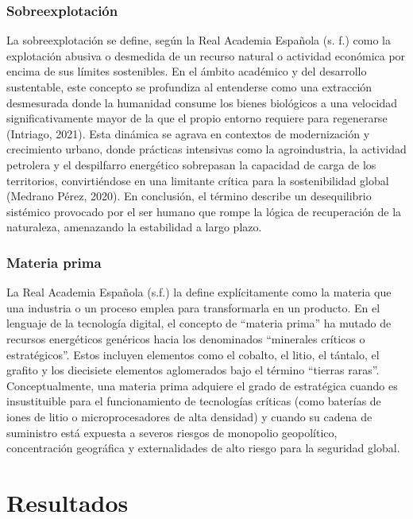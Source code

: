\documentclass[stu,12pt,a4paper]{apa7}
\begin{document}
    \subsubsection{Sobreexplotación}
La sobreexplotación se define, según la Real Academia Española (s. f.) como la explotación abusiva o desmedida de un recurso natural o actividad económica por encima de sus límites sostenibles. En el ámbito académico y del desarrollo sustentable, este concepto se profundiza al entenderse como una extracción desmesurada donde la humanidad consume los bienes biológicos a una velocidad significativamente mayor de la que el propio entorno requiere para regenerarse (Intriago, 2021). Esta dinámica se agrava en contextos de modernización y crecimiento urbano, donde prácticas intensivas como la agroindustria, la actividad petrolera y el despilfarro energético sobrepasan la capacidad de carga de los territorios, convirtiéndose en una limitante crítica para la sostenibilidad global (Medrano Pérez, 2020). En conclusión, el término describe un desequilibrio sistémico provocado por el ser humano que rompe la lógica de recuperación de la naturaleza, amenazando la estabilidad a largo plazo.
    \subsubsection{Materia prima}
La Real Academia Española (s.f.) la define explícitamente como la materia que una industria o un proceso emplea para transformarla en un producto. En el lenguaje de la tecnología digital, el concepto de ``materia prima'' ha mutado de recursos energéticos genéricos hacia los denominados ``minerales críticos o estratégicos''. Estos incluyen elementos como el cobalto, el litio, el tántalo, el grafito y los diecisiete elementos aglomerados bajo el término ``tierras raras''. Conceptualmente, una materia prima adquiere el grado de estratégica cuando es insustituible para el funcionamiento de tecnologías críticas (como baterías de iones de litio o microprocesadores de alta densidad) y cuando su cadena de suministro está expuesta a severos riesgos de monopolio geopolítico, concentración geográfica y externalidades de alto riesgo para la seguridad global.
    \section{Resultados}
\end{document}
